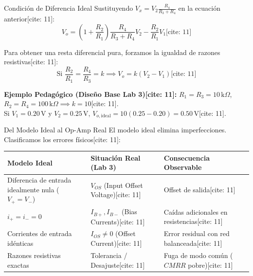 \documentclass[aspectratio=169, xcolor={table,xcdraw}]{beamer}
\begin{document}
\begin{frame}{Condición de Diferencia Ideal}
    Sustituyendo $V_x = V_2\frac{R_4}{R_3+R_4}$ en la ecuación anterior[cite: 11]:
    \begin{equation*}
        \boxed{ V_o = \left(1+\frac{R_2}{R_1}\right)\frac{R_4}{R_3+R_4}V_2 - \frac{R_2}{R_1}V_1 } \text{[cite: 11]}
    \end{equation*}
    
    Para obtener una resta diferencial pura, forzamos la igualdad de razones resistivas[cite: 11]:
    \begin{equation*}
        \text{Si } \frac{R_2}{R_1} = \frac{R_4}{R_3} = k \implies \boxed{ V_o = k(V_2 - V_1) } \text{[cite: 11]}
    \end{equation*}
    
    \textbf{Ejemplo Pedagógico (Diseño Base Lab 3)[cite: 11]:} $R_1=R_3=10\,\text{k}\Omega$, $R_2=R_4=100\,\text{k}\Omega \implies k=10$[cite: 11]. \\
    Si $V_1=0.20\,\text{V}$ y $V_2=0.25\,\text{V}$, $V_{o,\mathrm{ideal}} = 10(0.25 - 0.20) = \boxed{0.50\,\text{V}}$[cite: 11].
\end{frame}

\begin{frame}{Del Modelo Ideal al Op-Amp Real}
    El modelo ideal elimina imperfecciones. Clasificamos los errores físicos[cite: 11]:
    
    \vspace{0.3cm}
    \begin{table}[]
        \centering
        \small
        \renewcommand{\arraystretch}{1.3}
        \begin{tabularx}{\textwidth}{>{\raggedright\arraybackslash\hsize=1.2\hsize}X >{\raggedright\arraybackslash\hsize=0.8\hsize}X >{\raggedright\arraybackslash\hsize=1.0\hsize}X}
        \toprule
        \rowcolor[HTML]{EFEFEF}
        \textbf{Modelo Ideal} & \textbf{Situación Real (Lab 3)} & \textbf{Consecuencia Observable} \\ \midrule
        Diferencia de entrada idealmente nula ($V_+ = V_-$) & $V_{OS}$ (Input Offset Voltage)[cite: 11] & Offset de salida[cite: 11] \\
        $i_+ = i_- = 0$ & $I_{B+}, I_{B-}$ (Bias Currents)[cite: 11] & Caídas adicionales en resistencias[cite: 11] \\
        Corrientes de entrada idénticas & $I_{OS} \neq 0$ (Offset Current)[cite: 11] & Error residual con red balanceada[cite: 11] \\
        Razones resistivas exactas & Tolerancia / Desajuste[cite: 11] & Fuga de modo común ($CMRR$ pobre)[cite: 11] \\
        \bottomrule
        \end{tabularx}
    \end{table}
\end{frame}
\end{document}
